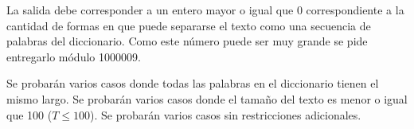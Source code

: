 \documentclass{oci}
\begin{document}
\begin{outputDescription}
  La salida debe corresponder a un entero mayor o igual que 0 correspondiente a
  la cantidad de formas en que puede separarse el texto como una secuencia de
  palabras del diccionario.
  Como este número puede ser muy grande se pide entregarlo módulo 1000009.
\end{outputDescription}

\begin{scoreDescription}
   Se probarán varios casos donde todas las palabras en el diccionario
  tienen el mismo largo.
   Se probarán varios casos donde el tamaño del texto es menor o igual
  que 100 ($T \leq 100$).
   Se probarán varios casos sin restricciones adicionales.
\end{scoreDescription}

\begin{sampleDescription}
\end{sampleDescription}
\end{document}
